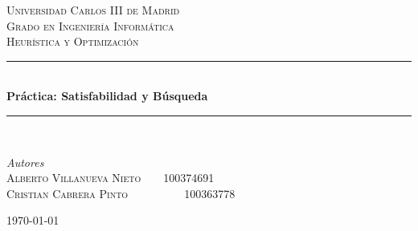 \documentclass[11pt,spanish]{article}
\begin{document}



	\begin{titlepage} %
	
	\newcommand{\HRule}{\rule{\linewidth}{0.5mm}} %
	
	\center %
	
	
	\textsc{\LARGE Universidad Carlos III de Madrid}\\[1.5cm] %
	
	\textsc{\Large Grado en Ingeniería Informática}\\[0.5cm] %
	
	\textsc{\large Heurística y Optimización}\\[0.5cm] %
	
	
	\HRule\\[0.4cm]
	
	{\huge\bfseries Práctica: Satisfabilidad y Búsqueda}\\[0.4cm] %
	
	\HRule\\[1.5cm]
	
	
	\begin{minipage}{0.7\textwidth}
		\begin{flushleft}
			\large
			\textit{Autores}\\
			\textsc{Alberto Villanueva Nieto\ \ \ \ 100374691}\\
			\textsc{Cristian Cabrera Pinto\ \ \ \ \ \ \ \ \ \ 100363778}
		\end{flushleft}
	\end{minipage}

	
	\vfill\vfill\vfill %
	
	{\large\today} %
	
	\vfill %
	
	\end{titlepage}
	\newpage
	\tableofcontents
	\newpage
\end{document}
